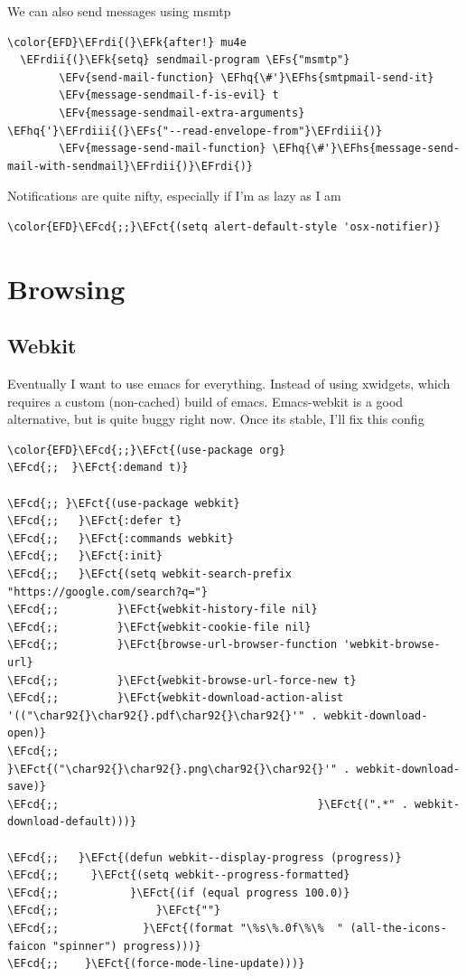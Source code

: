\documentclass{scrartcl}
\newcommand{\EFk}[1]{\textcolor{EFk}{#1}} %
\newcommand{\EFs}[1]{\textcolor{EFs}{#1}} %
\newcommand{\EFct}[1]{\textcolor{EFct}{#1}} %
\newcommand{\EFv}[1]{\textcolor{EFv}{#1}} %
\newcommand{\EFcd}[1]{\textcolor{EFcd}{#1}} %
\newcommand{\EFhq}[1]{#1} %
\newcommand{\EFhs}[1]{#1} %
\newcommand{\EFrdi}[1]{#1} %
\newcommand{\EFrdii}[1]{#1} %
\newcommand{\EFrdiii}[1]{#1} %
\begin{document}
We can also send messages using msmtp
\begin{Code}
\begin{Verbatim}[]
\color{EFD}\EFrdi{(}\EFk{after!} mu4e
  \EFrdii{(}\EFk{setq} sendmail-program \EFs{"msmtp"}
        \EFv{send-mail-function} \EFhq{\#'}\EFhs{smtpmail-send-it}
        \EFv{message-sendmail-f-is-evil} t
        \EFv{message-sendmail-extra-arguments} \EFhq{'}\EFrdiii{(}\EFs{"--read-envelope-from"}\EFrdiii{)}
        \EFv{message-send-mail-function} \EFhq{\#'}\EFhs{message-send-mail-with-sendmail}\EFrdii{)}\EFrdi{)}
\end{Verbatim}
\end{Code}

Notifications are quite nifty, especially if I'm as lazy as I am
\begin{Code}
\begin{Verbatim}[]
\color{EFD}\EFcd{;;}\EFct{(setq alert-default-style 'osx-notifier)}
\end{Verbatim}
\end{Code}

\section{Browsing}
\label{sec:orgc94c230}
\subsection{Webkit}
\label{sec:orgcf132c8}
Eventually I want to use emacs for everything. Instead of using xwidgets, which
requires a custom (non-cached) build of emacs. Emacs-webkit is a good
alternative, but is quite buggy right now. Once its stable, I'll fix this config
\begin{Code}
\begin{Verbatim}[]
\color{EFD}\EFcd{;;}\EFct{(use-package org}
\EFcd{;;  }\EFct{:demand t)}

\EFcd{;; }\EFct{(use-package webkit}
\EFcd{;;   }\EFct{:defer t}
\EFcd{;;   }\EFct{:commands webkit}
\EFcd{;;   }\EFct{:init}
\EFcd{;;   }\EFct{(setq webkit-search-prefix "https://google.com/search?q="}
\EFcd{;;         }\EFct{webkit-history-file nil}
\EFcd{;;         }\EFct{webkit-cookie-file nil}
\EFcd{;;         }\EFct{browse-url-browser-function 'webkit-browse-url}
\EFcd{;;         }\EFct{webkit-browse-url-force-new t}
\EFcd{;;         }\EFct{webkit-download-action-alist '(("\char92{}\char92{}.pdf\char92{}\char92{}'" . webkit-download-open)}
\EFcd{;;                                        }\EFct{("\char92{}\char92{}.png\char92{}\char92{}'" . webkit-download-save)}
\EFcd{;;                                        }\EFct{(".*" . webkit-download-default)))}

\EFcd{;;   }\EFct{(defun webkit--display-progress (progress)}
\EFcd{;;     }\EFct{(setq webkit--progress-formatted}
\EFcd{;;           }\EFct{(if (equal progress 100.0)}
\EFcd{;;               }\EFct{""}
\EFcd{;;             }\EFct{(format "\%s\%.0f\%\%  " (all-the-icons-faicon "spinner") progress)))}
\EFcd{;;    }\EFct{(force-mode-line-update)))}
\end{Verbatim}
\end{Code}
\end{document}
